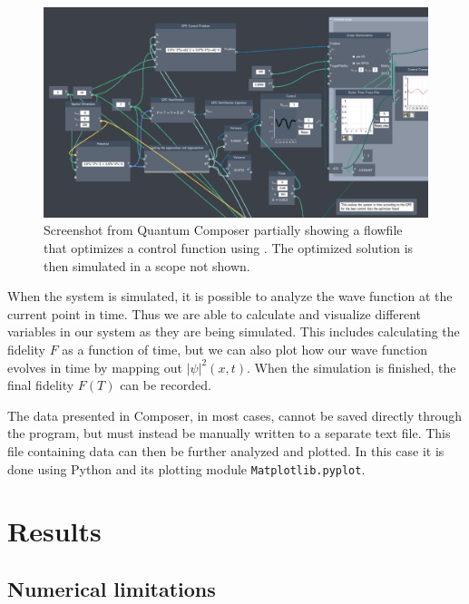 \documentclass[a4paper, twocolumn]{revtex4-1}
\begin{document}
\begin{figure}
	\centering
	\includegraphics[width=\textwidth]{graphics/composerScreens/composerWide.png}
	\caption{Screenshot from Quantum Composer partially showing a flowfile that optimizes a control function using . The optimized solution is then simulated in a scope not shown.}
	\label{fig:composerScreens}
\end{figure}

When the system is simulated, it is possible to analyze the wave function at the current point in time. Thus we are able to calculate and visualize different variables in our system as they are being simulated. This includes calculating the fidelity $F$ as a function of time, but we can also plot how our wave function evolves in time by mapping out $|\psi|^2(x,t)$. When the simulation is finished, the final fidelity $F(T)$ can be recorded.


The data presented in Composer, in most cases, cannot be saved directly through the program, but must instead be manually written to a separate text file. This file containing data can then be further analyzed and plotted. In this case it is done using Python and its plotting module \texttt{Matplotlib.pyplot}.


\section{Results}\label{sec:results}
\subsection{\label{subsec:numericalLimitations} Numerical limitations}
\end{document}
